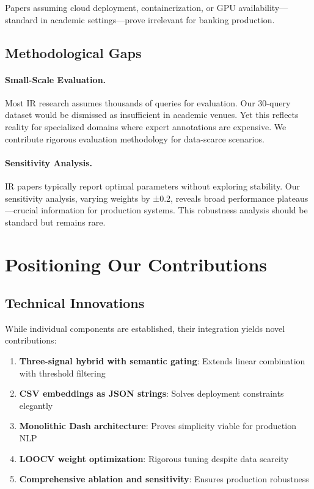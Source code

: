 Papers assuming cloud deployment, containerization, or GPU availability—standard in academic settings—prove irrelevant for banking production.

\subsection{Methodological Gaps}

\paragraph{Small-Scale Evaluation.} Most IR research assumes thousands of queries for evaluation. Our 30-query dataset would be dismissed as insufficient in academic venues. Yet this reflects reality for specialized domains where expert annotations are expensive. We contribute rigorous evaluation methodology for data-scarce scenarios.

\paragraph{Sensitivity Analysis.} IR papers typically report optimal parameters without exploring stability. Our sensitivity analysis, varying weights by ±0.2, reveals broad performance plateaus—crucial information for production systems. This robustness analysis should be standard but remains rare.

\section{Positioning Our Contributions}

\subsection{Technical Innovations}

While individual components are established, their integration yields novel contributions:

\begin{enumerate}[leftmargin=*,itemsep=2pt,topsep=2pt]
 \item \textbf{Three-signal hybrid with semantic gating}: Extends linear combination with threshold filtering
 \item \textbf{CSV embeddings as JSON strings}: Solves deployment constraints elegantly
 \item \textbf{Monolithic Dash architecture}: Proves simplicity viable for production NLP
 \item \textbf{LOOCV weight optimization}: Rigorous tuning despite data scarcity
 \item \textbf{Comprehensive ablation and sensitivity}: Ensures production robustness
\end{enumerate}

